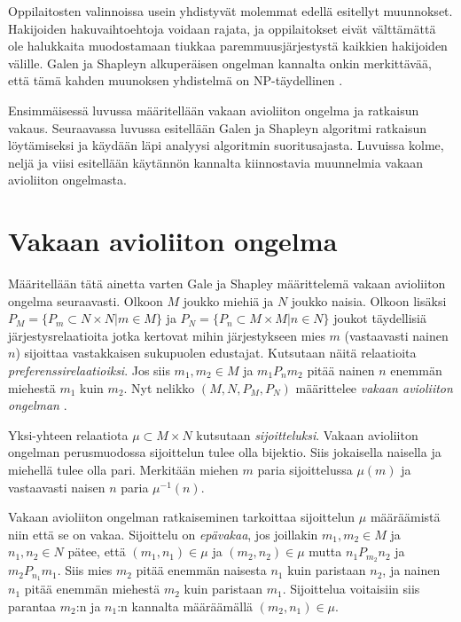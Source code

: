\documentclass[gradu, twoside]{tktltiki}
\begin{document}
Oppilaitosten valinnoissa usein yhdistyvät molemmat edellä esitellyt
muunnokset. Hakijoiden hakuvaihtoehtoja voidaan rajata, ja
oppilaitokset eivät välttämättä ole halukkaita muodostamaan tiukkaa
paremmuusjärjestystä kaikkien hakijoiden välille. Galen ja Shapleyn
alkuperäisen ongelman kannalta onkin merkittävää, että tämä kahden
muunoksen yhdistelmä on NP-täydellinen \cite{manlove02}.

Ensimmäisessä luvussa määritellään vakaan avioliiton ongelma ja
ratkaisun vakaus. Seuraavassa luvussa esitellään Galen ja Shapleyn
algoritmi ratkaisun löytämiseksi ja käydään läpi analyysi algoritmin
suoritusajasta. Luvuissa kolme, neljä ja viisi esitellään käytännön
kannalta kiinnostavia muunnelmia vakaan avioliiton ongelmasta.

\section{Vakaan avioliiton ongelma}

Määritellään tätä ainetta varten Gale ja Shapley määrittelemä
\cite{galeshapley62} vakaan avioliiton ongelma seuraavasti. Olkoon $M$
joukko miehiä ja $N$ joukko naisia. Olkoon lisäksi $P_M = \{P_m
\subset N \times N | m \in M\}$ ja $P_N = \{P_n \subset M \times M | n
\in N\}$ joukot täydellisiä järjestysrelaatioita jotka kertovat mihin
järjestykseen mies $m$ (vastaavasti nainen $n$) sijoittaa vastakkaisen
sukupuolen edustajat. Kutsutaan näitä relaatioita
\emph{preferenssirelaatioiksi}. Jos siis $m_1,m_2 \in M$ ja
$m_1P_nm_2$ pitää nainen $n$ enemmän miehestä $m_1$ kuin $m_2$. Nyt
nelikko $(M, N, P_M, P_N)$ määrittelee \emph{vakaan avioliiton
  ongelman }.

Yksi-yhteen relaatiota $\mu \subset M \times N$ kutsutaan
\emph{sijoitteluksi}. Vakaan avioliiton ongelman perusmuodossa
sijoittelun tulee olla bijektio. Siis jokaisella naisella ja miehellä
tulee olla pari. Merkitään miehen $m$ paria sijoittelussa $\mu(m)$ ja
vastaavasti naisen $n$ paria $\mu^{-1}(n)$.

Vakaan avioliiton ongelman ratkaiseminen tarkoittaa sijoittelun $\mu$
määräämistä niin että se on vakaa. Sijoittelu on \emph{epävakaa}, jos
joillakin $m_1, m_2 \in M$ ja $n_1, n_2 \in N$ pätee, että $(m_1, n_1)
\in \mu$ ja $(m_2, n_2) \in \mu$ mutta $n_1P_{m_2}n_2$ ja
$m_2P_{n_1}m_1$. Siis mies $m_2$ pitää enemmän naisesta $n_1$ kuin
paristaan $n_2$, ja nainen $n_1$ pitää enemmän miehestä $m_2$ kuin
paristaan $m_1$. Sijoittelua voitaisiin siis parantaa $m_2$:n ja
$n_1$:n kannalta määräämällä $(m_2, n_1) \in \mu$.
\cite{galeshapley62}
\end{document}
